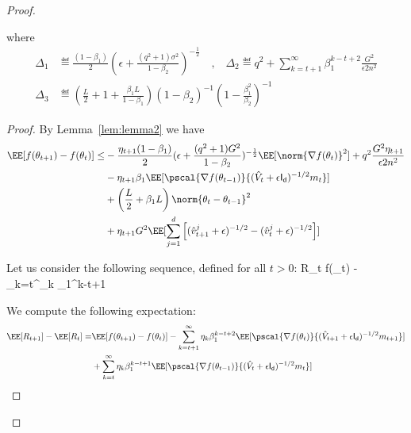 \documentclass[11pt]{article}
\begin{document}
\begin{proof}
\begin{Theorem*}
where 
\begin{equation}
\begin{split}
\Delta_1 & \eqdef \frac{(1-\beta_1)}{2} (\epsilon + \frac{(q^2+1)\sigma^2}{1 - \beta_2})^{-\frac{1}{2}} \quad \textrm{,} \quad \Delta_2 \eqdef q^2 + \sum_{k=t+1}^\infty  \beta_1^{k-t+2}\frac{G^2 }{\epsilon 2n^2}\\
\Delta_3 &\eqdef \left(\frac{L}{2} + 1+ \frac{\beta_1L}{1-\beta_1} \right) (1-\beta_2)^{-1} (1 - \frac{\beta_1^{2}}{\beta_2})^{-1}
\end{split}
\end{equation}
\end{Theorem*}



\begin{proof}


By Lemma~\ref{lem:lemma2} we have 
\begin{equation}
\begin{split}
\EE[f(\theta_{t+1}) - f(\theta_{t}) ] \leq &   - \frac{\eta_{t+1}(1-\beta_1)}{2}  (\epsilon + \frac{(q^2+1)G^2}{1 - \beta_2})^{-\frac{1}{2}} \EE[\norm{\nabla f(\theta_t)}^2] +q^2 \frac{G^2 \eta_{t+1}}{\epsilon 2n^2} \\
&- \eta_{t+1} \beta_1\EE[\pscal{\nabla f(\theta_{t-1})}{(\hat{V}_{t} + \epsilon \mathsf{I_d})^{-1/2} m_{t}}]\\
& +  \left(\frac{L}{2} + \beta_1 L \right) \norm{\theta_t - \theta_{t-1}}^2\\
&+   \eta_{t+1} G^2 \EE[\sum_{j=1}^d \left[(\hat{v}^j_{t+1} + \epsilon )^{-1/2} - (\hat{v}^j_{t} + \epsilon )^{-1/2}  \right] ]
\end{split}
\end{equation}

Let us consider the following sequence, defined for all $t >0$:
\beq\label{eq:defR}
R_t \eqdef f(\theta_{t}) - \sum_{k=t}^\infty \eta_{k} \beta_1^{k-t+1}
\eeq

We compute the following expectation:
\begin{equation}
\begin{split}
\EE[R_{t+1}] - \EE[R_t] =& \EE[f(\theta_{t+1}) - f(\theta_{t}) ]  -  \sum_{k=t+1}^\infty \eta_{k} \beta_1^{k-t+2}\EE[\pscal{\nabla f(\theta_{t})}{(\hat{V}_{t+1} + \epsilon \mathsf{I_d})^{-1/2} m_{t+1}}] \\
& +  \sum_{k=t}^\infty \eta_{k} \beta_1^{k-t+1}\EE[\pscal{\nabla f(\theta_{t-1})}{(\hat{V}_{t} + \epsilon \mathsf{I_d})^{-1/2} m_{t}}]\\
\end{split}
\end{equation}


\end{proof}
\end{proof}
\end{document}
